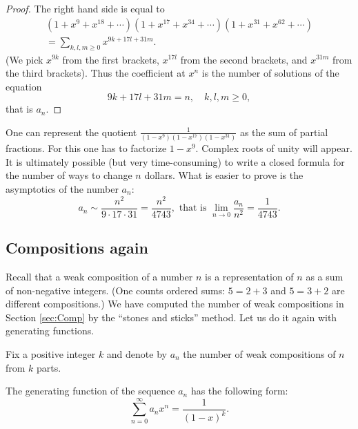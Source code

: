 \begin{page}

\begin{proof}
The right hand side is equal to
\begin{multline*}
(1 + x^9 + x^{18} + \cdots)(1 + x^{17} + x^{34} + \cdots)(1 + x^{31} + x^{62} + \cdots)\\
= \sum_{k,l,m\ge 0} x^{9k+17l+31m}.
\end{multline*}
(We pick $x^{9k}$ from the first brackets, $x^{17l}$ from the second brackets, and $x^{31m}$ from the third brackets).
Thus the coefficient at $x^n$ is the number of solutions of the equation
\[
9k + 17l + 31m = n, \quad k, l, m \ge 0,
\]
that is $a_n$.
\end{proof}

One can represent the quotient $\frac{1}{(1-x^9)(1-x^{17})(1-x^{31})}$ as the sum of partial fractions.
For this one has to factorize $1-x^9$.
Complex roots of unity will appear.
It is ultimately possible (but very time-consuming) to write a closed formula for the number of ways to change $n$ dollars.
What is easier to prove is the asymptotics of the number $a_n$:
\[
a_n \sim \frac{n^2}{9 \cdot 17 \cdot 31} = \frac{n^2}{4743}, \text{ that is } \lim_{n \to 0} \frac{a_n}{n^2} = \frac{1}{4743}.
\]





\end{page}

\begin{page}

\subsection{Compositions again}
Recall that a weak composition of a number $n$ is a representation of $n$ as a sum of non-negative integers.
(One counts ordered sums: $5 = 2 + 3$ and $5 = 3 + 2$ are different compositions.)
We have computed the number of weak compositions in Section \ref{sec:Comp} by the ``stones and sticks'' method.
Let us do it again with generating functions.

Fix a positive integer $k$ and denote by $a_n$ the number of weak compositions of $n$ from $k$ parts.

\end{page}

\begin{page}

\begin{thm}
The generating function of the sequence $a_n$ has the following form:
\[
\sum_{n=0}^\infty a_n x^n = \frac{1}{(1-x)^k}.
\]
\end{thm}

\end{page}

